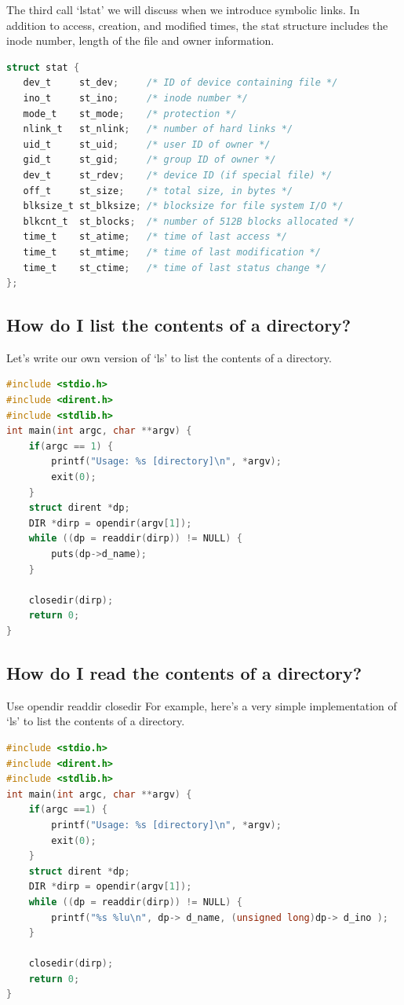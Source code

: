 The third call `lstat' we will discuss when we introduce symbolic links. In addition to access, creation, and modified times, the stat structure includes the inode number, length of the file and owner information.

\begin{lstlisting}[language=C]
struct stat {
   dev_t     st_dev;     /* ID of device containing file */
   ino_t     st_ino;     /* inode number */
   mode_t    st_mode;    /* protection */
   nlink_t   st_nlink;   /* number of hard links */
   uid_t     st_uid;     /* user ID of owner */
   gid_t     st_gid;     /* group ID of owner */
   dev_t     st_rdev;    /* device ID (if special file) */
   off_t     st_size;    /* total size, in bytes */
   blksize_t st_blksize; /* blocksize for file system I/O */
   blkcnt_t  st_blocks;  /* number of 512B blocks allocated */
   time_t    st_atime;   /* time of last access */
   time_t    st_mtime;   /* time of last modification */
   time_t    st_ctime;   /* time of last status change */
};
\end{lstlisting}

\subsection{How do I list the contents of a directory?}

Let's write our own version of `ls' to list the contents of a directory.

\begin{lstlisting}[language=C]
#include <stdio.h>
#include <dirent.h>
#include <stdlib.h>
int main(int argc, char **argv) {
    if(argc == 1) {
        printf("Usage: %s [directory]\n", *argv);
        exit(0);
    }
    struct dirent *dp;
    DIR *dirp = opendir(argv[1]);
    while ((dp = readdir(dirp)) != NULL) {
        puts(dp->d_name);
    }

    closedir(dirp);
    return 0;
}
\end{lstlisting}

\subsection{How do I read the contents of a directory?}

Use opendir readdir closedir For example, here's a very simple implementation of `ls' to list the contents of a directory.

\begin{lstlisting}[language=C]
#include <stdio.h>
#include <dirent.h>
#include <stdlib.h>
int main(int argc, char **argv) {
    if(argc ==1) {
        printf("Usage: %s [directory]\n", *argv);
        exit(0);
    }
    struct dirent *dp;
    DIR *dirp = opendir(argv[1]);
    while ((dp = readdir(dirp)) != NULL) {
        printf("%s %lu\n", dp-> d_name, (unsigned long)dp-> d_ino );
    }

    closedir(dirp);
    return 0;
}
\end{lstlisting}

